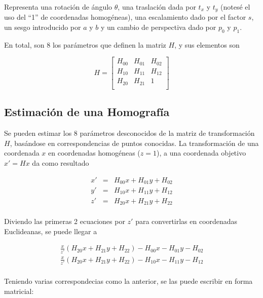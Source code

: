 Representa una rotación de ángulo $\theta$, una traslación dada por $t_{x}$ y $t_{y}$ (notesé el uso del ``1'' de coordenadas
homogéneas), una escalamiento dado por el factor $s$, un sesgo introducido por $a$ y $b$ y un cambio de perspectiva
dado por $p_{0}$ y $p_{1}$.

En total, son 8 los parámetros que definen la matriz $H$, y sus elementos son

\begin{equation}
    H =
    \begin{bmatrix}
        H_{00} & H_{01} & H_{02}\\
        H_{10} & H_{11} & H_{12}\\
        H_{20} & H_{21} & 1\\
    \end{bmatrix}
\end{equation}

\subsection{Estimación de una Homografía}

Se pueden estimar los 8 parámetros desconocidos de la matriz de transformación $H$, basándose en correspondencias de puntos conocidas.
La transformación de una coordenada $x$ en coordenadas homogéneas ($z=1$), a una coordenada objetivo $x'= Hx$ da como resultado

\begin{eqnarray*}
    x' &=& H_{00}x + H_{01}y + H_{02}\\
    y' &=& H_{10}x + H_{11}y + H_{12}\\
    z' &=& H_{20}x + H_{21}y + H_{22}\\
\end{eqnarray*}

Diviendo las primeras 2 ecuaciones por $z'$ para convertirlas en coordenadas Euclideanas, se puede llegar a

\begin{eqnarray*}
    \frac{x}{z'}(H_{20}x + H_{21}y + H_{22}) - H_{00}x - H_{01}y - H_{02}\\
    \frac{x}{z'}(H_{20}x + H_{21}y + H_{22}) - H_{10}x - H_{11}y - H_{12}\\
\end{eqnarray*}

Teniendo varias correspondecias como la anterior, se las puede escribir en forma matricial:

